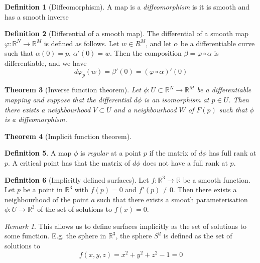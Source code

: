 \documentclass[10pt, oneside, reqno]{amsart}
\newcommand{\R}{\mathbb{R}}
\theoremstyle{plain}%
\newtheorem{thm}{Theorem}[section]
\theoremstyle{definition}
\newtheorem{defn}[thm]{Definition}
\theoremstyle{remark}
\newtheorem*{rem}{Remark}
\begin{document}
\begin{defn}[Diffeomorphism] 
	A map is a \emph{diffeomorphism} is it is smooth and has a smooth inverse
\end{defn}

\begin{defn}[Differential of a smooth map]
	The differential of a smooth map $\varphi: \R^N \rightarrow \R^M$ is defined as follows.  Let $w \in R^M$, and let $\alpha$ be a differentiable curve such that $\alpha(0) = p$, $\alpha'(0) = w$.  Then the composition $\beta = \varphi \circ \alpha$ is differentiable, and we have \[
		d \varphi_p (w) = \beta'(0) = (\varphi \circ \alpha)'(0)
	\]
	
\end{defn}

\begin{thm}[Inverse function theorem]
	Let  $\phi : U \subset \R^N \rightarrow \R^M$ be a differentiable mapping and suppose that the differential $d \phi$ is an isomorphism at $p \in U$.  Then there exists a neighbourhood $V \subset U$ and a neighbourhood $W$ of $F(p)$ such that $\phi$ is a diffeomorphism. 
\end{thm}

\begin{thm}[Implicit function theorem]
	
\end{thm}

\begin{defn}
	A map $\phi$ is \emph{regular} at a point $p$ if the matrix of $d\phi$ has full rank at $p$.  A critical point has that the matrix of $d\phi$ does not have a full rank at $p$.
\end{defn}

\begin{defn}[Implicitly defined surfaces]
	Let $f: \R^3 \rightarrow \R$ be a smooth function.  Let $p$ be a point in $\R^3$ with $f(p) =0$ and $f'(p) \neq 0$.  Then there exists a neighbourhood of the point $a$ such that there exists a smooth parameterisation $\phi : U \rightarrow \R^3$ of the set of solutions to $f(x) = 0$.
\end{defn}

\begin{rem}
	This allows us to define surfaces implicitly as the set of solutions to some function.  E.g. the sphere in $\R^3$, the sphere $S^2$ is defined as the set of solutions to \[
		f(x,y,z) = x^2 +y^2 + z^2 - 1 = 0
	\]
\end{rem}
\end{document}
